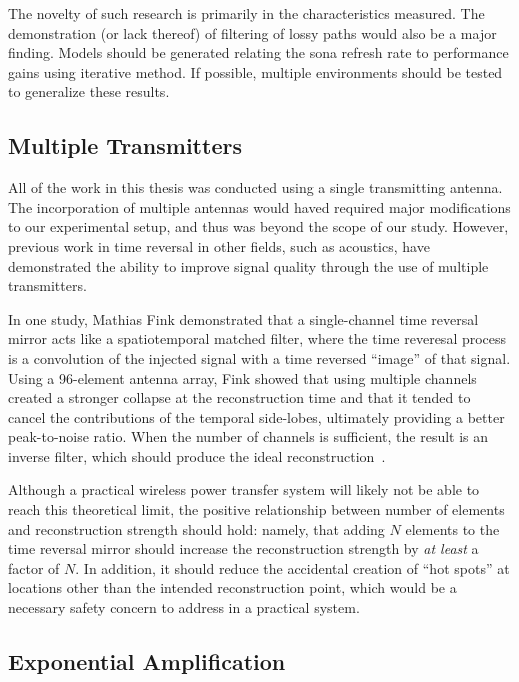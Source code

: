 The novelty of such research is primarily in the characteristics measured. The demonstration (or lack thereof) of filtering of lossy paths would also be a major finding. Models should be generated relating the sona refresh rate to performance gains using iterative method. If possible, multiple environments should be tested to generalize these results.

\subsection{Multiple Transmitters}

All of the work in this thesis was conducted using a single transmitting antenna. The incorporation of multiple antennas would haved required major modifications to our experimental setup, and thus was beyond the scope of our study. However, previous work in time reversal in other fields, such as acoustics, have demonstrated the ability to improve signal quality through the use of multiple transmitters.

In one study, Mathias Fink demonstrated that a single-channel time reversal mirror acts like a spatiotemporal matched filter, where the time reveresal process is a convolution of the injected signal with a time reversed ``image'' of that signal. Using a 96-element antenna array, Fink showed that using multiple channels created a stronger collapse at the reconstruction time and that it tended to cancel the contributions of the temporal side-lobes, ultimately providing a better peak-to-noise ratio. When the number of channels is sufficient, the result is an inverse filter, which should produce the ideal reconstruction~\cite{fink-multi-channel}.

Although a practical wireless power transfer system will likely not be able to reach this theoretical limit, the positive relationship between number of elements and reconstruction strength should hold: namely, that adding $N$ elements to the time reversal mirror should increase the reconstruction strength by \textit{at least} a factor of $N$. In addition, it should reduce the accidental creation of ``hot spots'' at locations other than the intended reconstruction point, which would be a necessary safety concern to address in a practical system.

\subsection{Exponential Amplification}

